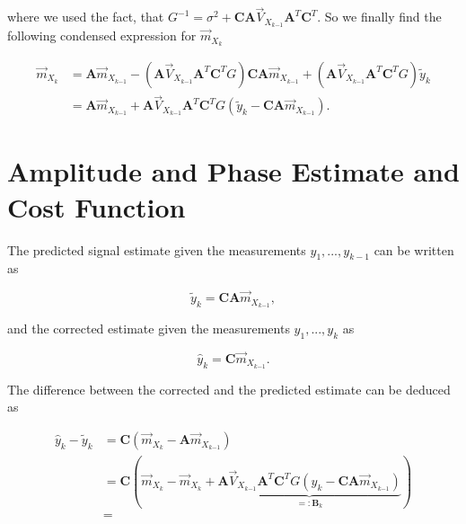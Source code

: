 \documentclass[11pt,a4paper,twoside]{report}
\newcommand{\messF}[3]{\overrightarrow{#1}_{{#2}_{k{#3}}}}
\newcommand{\mat}[1]{\mathbf{#1}}
\begin{document}
where we used the fact, that $G^{-1} = \sigma^2 + \mat{C} \mat{A}\messF{V}{X}{-1} \mat{A}^T\mat{C}^T$. So we finally find the following condensed expression for $\messF{m}{X}{}$

\begin{align}
	\label{eq: update rule, mean vector}
	\messF{m}{X}{} &= \mat{A} \messF{m}{X}{-1} - \left(\mat{A}\messF{V}{X}{-1}\mat{A}^T \mat{C}^T G\right)\mat{C}\mat{A}\messF{m}{X}{-1} + \left(\mat{A}\messF{V}{X}{-1}\mat{A}^T\mat{C}^T G\right) \tilde{y}_k \\
	&= \mat{A} \messF{m}{X}{-1} + \mat{A}\messF{V}{X}{-1}\mat{A}^T\mat{C}^T G \left( \tilde{y}_k - \mat{C}\mat{A}\messF{m}{X}{-1} \right).
\end{align}

%


\chapter*{Amplitude and Phase Estimate and Cost Function}
The predicted signal estimate given the measurements ${y_1,...,y_{k-1}}$ can be written as

\begin{equation*}
	\tilde{y}_k = \mat{CA}\messF{m}{X}{-1},
\end{equation*}

and the corrected estimate given the measurements ${y_1,...,y_k}$ as

\begin{equation*}
	\hat{y}_k = \mat{C}\messF{m}{X}{-1}.
\end{equation*}

The difference between the corrected and the predicted estimate can be deduced as

\begin{align}
	\label{eq: }
	\hat{y}_k - \tilde{y}_k &= \mat{C}\left(\messF{m}{X}{} - \mat{A}\messF{m}{X}{-1}\right) \\
	&= \mat{C}\left(\messF{m}{X}{} - \messF{m}{X}{} + \underbrace{\mat{A}\messF{V}{X}{-1}\mat{A}^T\mat{C}^TG\left(y_k-\mat{CA}\messF{m}{X}{-1}\right)}_{=:\mat{B}_k}\right) \\
	&= 
\end{align}
\end{document}
